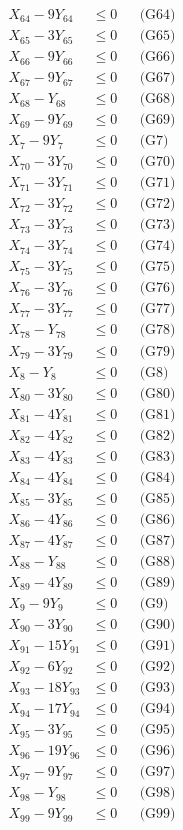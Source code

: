 \documentclass[a4paper,10pt]{article}
\begin{document}
{\begin{align}
X_{64} - 9Y_{64} &\leq 0 && \text{(G64)} \\
X_{65} - 3Y_{65} &\leq 0 && \text{(G65)} \\
X_{66} - 9Y_{66} &\leq 0 && \text{(G66)} \\
X_{67} - 9Y_{67} &\leq 0 && \text{(G67)} \\
X_{68} - Y_{68} &\leq 0 && \text{(G68)} \\
X_{69} - 9Y_{69} &\leq 0 && \text{(G69)} \\
X_{7} - 9Y_{7} &\leq 0 && \text{(G7)} \\
X_{70} - 3Y_{70} &\leq 0 && \text{(G70)} \\
X_{71} - 3Y_{71} &\leq 0 && \text{(G71)} \\
X_{72} - 3Y_{72} &\leq 0 && \text{(G72)} \\
X_{73} - 3Y_{73} &\leq 0 && \text{(G73)} \\
X_{74} - 3Y_{74} &\leq 0 && \text{(G74)} \\
X_{75} - 3Y_{75} &\leq 0 && \text{(G75)} \\
X_{76} - 3Y_{76} &\leq 0 && \text{(G76)} \\
X_{77} - 3Y_{77} &\leq 0 && \text{(G77)} \\
X_{78} - Y_{78} &\leq 0 && \text{(G78)} \\
X_{79} - 3Y_{79} &\leq 0 && \text{(G79)} \\
X_{8} - Y_{8} &\leq 0 && \text{(G8)} \\
X_{80} - 3Y_{80} &\leq 0 && \text{(G80)} \\
\allowbreak
X_{81} - 4Y_{81} &\leq 0 && \text{(G81)} \\
X_{82} - 4Y_{82} &\leq 0 && \text{(G82)} \\
X_{83} - 4Y_{83} &\leq 0 && \text{(G83)} \\
X_{84} - 4Y_{84} &\leq 0 && \text{(G84)} \\
X_{85} - 3Y_{85} &\leq 0 && \text{(G85)} \\
X_{86} - 4Y_{86} &\leq 0 && \text{(G86)} \\
X_{87} - 4Y_{87} &\leq 0 && \text{(G87)} \\
X_{88} - Y_{88} &\leq 0 && \text{(G88)} \\
X_{89} - 4Y_{89} &\leq 0 && \text{(G89)} \\
X_{9} - 9Y_{9} &\leq 0 && \text{(G9)} \\
X_{90} - 3Y_{90} &\leq 0 && \text{(G90)} \\
X_{91} - 15Y_{91} &\leq 0 && \text{(G91)} \\
X_{92} - 6Y_{92} &\leq 0 && \text{(G92)} \\
X_{93} - 18Y_{93} &\leq 0 && \text{(G93)} \\
X_{94} - 17Y_{94} &\leq 0 && \text{(G94)} \\
X_{95} - 3Y_{95} &\leq 0 && \text{(G95)} \\
X_{96} - 19Y_{96} &\leq 0 && \text{(G96)} \\
X_{97} - 9Y_{97} &\leq 0 && \text{(G97)} \\
X_{98} - Y_{98} &\leq 0 && \text{(G98)} \\
X_{99} - 9Y_{99} &\leq 0 && \text{(G99)} \\
\allowbreak
\end{align}}
\end{document}
